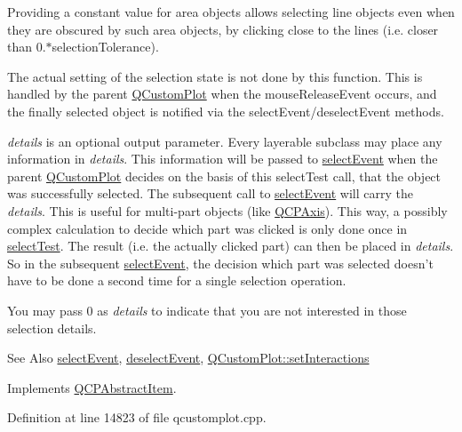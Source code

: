 Providing a constant value for area objects allows selecting line objects even when they are obscured by such area objects, by clicking close to the lines (i.\-e. closer than 0.$\ast$selection\-Tolerance).

The actual setting of the selection state is not done by this function. This is handled by the parent \hyperlink{class_q_custom_plot}{Q\-Custom\-Plot} when the mouse\-Release\-Event occurs, and the finally selected object is notified via the select\-Event/deselect\-Event methods.

{\itshape details} is an optional output parameter. Every layerable subclass may place any information in {\itshape details}. This information will be passed to \hyperlink{class_q_c_p_abstract_item_aaf92af7b9893712959a6c073d334d88d}{select\-Event} when the parent \hyperlink{class_q_custom_plot}{Q\-Custom\-Plot} decides on the basis of this select\-Test call, that the object was successfully selected. The subsequent call to \hyperlink{class_q_c_p_abstract_item_aaf92af7b9893712959a6c073d334d88d}{select\-Event} will carry the {\itshape details}. This is useful for multi-\/part objects (like \hyperlink{class_q_c_p_axis}{Q\-C\-P\-Axis}). This way, a possibly complex calculation to decide which part was clicked is only done once in \hyperlink{class_q_c_p_item_line_a7541e5d9378ca121d07b0df3b24f7178}{select\-Test}. The result (i.\-e. the actually clicked part) can then be placed in {\itshape details}. So in the subsequent \hyperlink{class_q_c_p_abstract_item_aaf92af7b9893712959a6c073d334d88d}{select\-Event}, the decision which part was selected doesn't have to be done a second time for a single selection operation.

You may pass 0 as {\itshape details} to indicate that you are not interested in those selection details.

\begin{DoxySeeAlso}{See Also}
\hyperlink{class_q_c_p_abstract_item_aaf92af7b9893712959a6c073d334d88d}{select\-Event}, \hyperlink{class_q_c_p_abstract_item_a91f090d6763cfedb0749219c63788ae9}{deselect\-Event}, \hyperlink{class_q_custom_plot_a5ee1e2f6ae27419deca53e75907c27e5}{Q\-Custom\-Plot\-::set\-Interactions} 
\end{DoxySeeAlso}


Implements \hyperlink{class_q_c_p_abstract_item_a96d522d10ffc0413b9a366c6f7f0476b}{Q\-C\-P\-Abstract\-Item}.



Definition at line 14823 of file qcustomplot.\-cpp.

